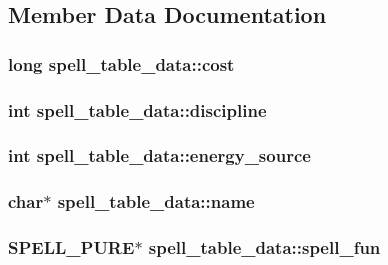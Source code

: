 \subsection{Member Data Documentation}
\hypertarget{structspell__table__data_a8593b50ec2569a90656121a6730e3e7d}{
\subsubsection[{cost}]{\setlength{\rightskip}{0pt plus 5cm}long spell\-\_\-table\-\_\-data\-::cost}}\label{structspell__table__data_a8593b50ec2569a90656121a6730e3e7d}
\hypertarget{structspell__table__data_ab86f41a700bbfff8aef37a2e29abc0dc}{
\subsubsection[{discipline}]{\setlength{\rightskip}{0pt plus 5cm}int spell\-\_\-table\-\_\-data\-::discipline}}\label{structspell__table__data_ab86f41a700bbfff8aef37a2e29abc0dc}
\hypertarget{structspell__table__data_a8093c61a451186d47de84ededb7b85d8}{
\subsubsection[{energy\-\_\-source}]{\setlength{\rightskip}{0pt plus 5cm}int spell\-\_\-table\-\_\-data\-::energy\-\_\-source}}\label{structspell__table__data_a8093c61a451186d47de84ededb7b85d8}
\hypertarget{structspell__table__data_a3be3f1a8d33ce0d4c8caf2806ce551c9}{
\subsubsection[{name}]{\setlength{\rightskip}{0pt plus 5cm}char$\ast$ spell\-\_\-table\-\_\-data\-::name}}\label{structspell__table__data_a3be3f1a8d33ce0d4c8caf2806ce551c9}
\hypertarget{structspell__table__data_a4fd5de4bed0016a1937dd3ed735c1c7d}{
\subsubsection[{spell\-\_\-fun}]{\setlength{\rightskip}{0pt plus 5cm}S\-P\-E\-L\-L\-\_\-\-P\-U\-R\-E$\ast$ spell\-\_\-table\-\_\-data\-::spell\-\_\-fun}}\label{structspell__table__data_a4fd5de4bed0016a1937dd3ed735c1c7d}
